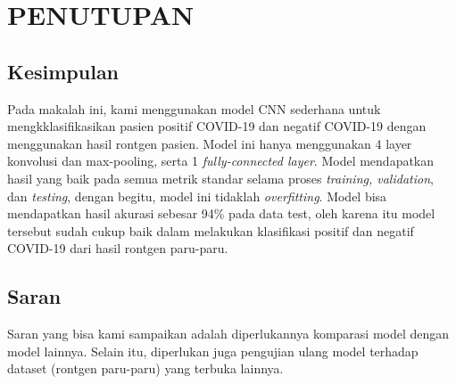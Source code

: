 \chapter{PENUTUPAN}

\section{Kesimpulan}
Pada makalah ini, kami menggunakan model CNN sederhana untuk mengkklasifikasikan pasien positif COVID-19 dan negatif COVID-19 dengan menggunakan hasil rontgen pasien. Model ini hanya menggunakan 4 layer konvolusi dan max-pooling, serta 1 \textit{fully-connected layer}. Model mendapatkan hasil yang baik pada semua metrik standar selama proses \textit{training, validation}, dan \textit{testing}, dengan begitu,  model ini tidaklah \textit{overfitting}. Model bisa mendapatkan hasil akurasi sebesar 94\% pada data test, oleh  karena itu model tersebut sudah cukup baik dalam melakukan klasifikasi positif
dan negatif COVID-19 dari hasil rontgen paru-paru.

\section{Saran}
Saran yang bisa kami sampaikan adalah diperlukannya komparasi model dengan model lainnya. Selain itu, diperlukan juga pengujian ulang model terhadap dataset (rontgen paru-paru) yang terbuka lainnya.




